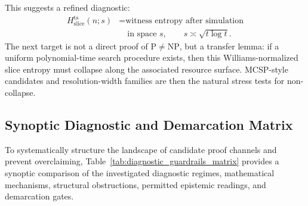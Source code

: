 \documentclass[aps,prd,twocolumn,superscriptaddress,nofootinbib]{revtex4-2}
\theoremstyle{definition}
\theoremstyle{remark}
\begin{document}
This suggests a refined diagnostic:
\[
\begin{aligned}
  H_{\mathrm{slice}}^{\mathrm{ts}}(n;s)
  &= \text{witness entropy after simulation}\\
  &\quad \text{in space }s,\qquad s \asymp \sqrt{t\log t}.
\end{aligned}
\]
The next target is not a direct proof of $\mathrm{P}\ne\mathrm{NP}$, but a
transfer lemma: if a uniform polynomial-time search procedure exists, then
this Williams-normalized slice entropy must collapse along the associated
resource surface.  MCSP-style candidates and resolution-width families are
then the natural stress tests for non-collapse.

\subsection{Synoptic Diagnostic and Demarcation Matrix}
\label{subsec:diagnostic_matrix}

To systematically structure the landscape of candidate proof channels and prevent overclaiming, Table~\ref{tab:diagnostic_guardrails_matrix} provides a synoptic comparison of the investigated diagnostic regimes, mathematical mechanisms, structural obstructions, permitted epistemic readings, and demarcation gates.
\end{document}

